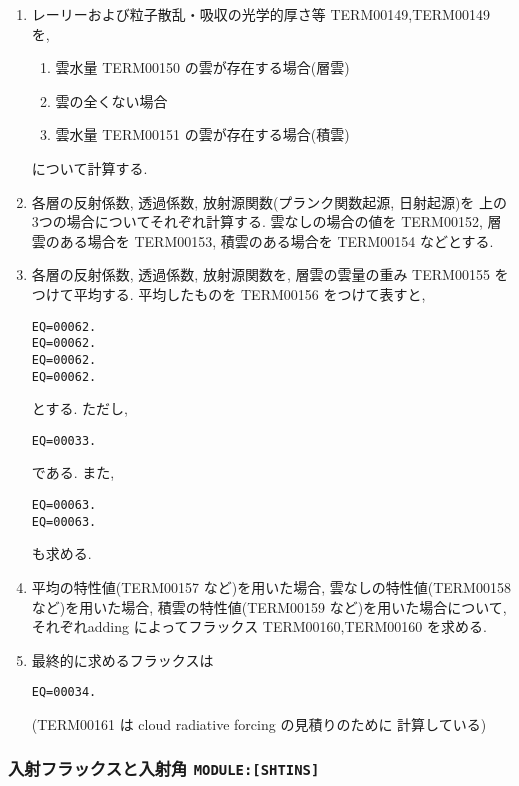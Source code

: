 \begin{enumerate}
\item レーリーおよび粒子散乱・吸収の光学的厚さ等
      TERM00149,TERM00149 を,
      \begin{enumerate}
      \item 雲水量 TERM00150 の雲が存在する場合(層雲)
      \item 雲の全くない場合
      \item 雲水量 TERM00151 の雲が存在する場合(積雲)
      \end{enumerate}
      について計算する.

\item 各層の反射係数, 透過係数, 
      放射源関数(プランク関数起源, 日射起源)を
      上の3つの場合についてそれぞれ計算する.
      雲なしの場合の値を
      TERM00152, 層雲のある場合を TERM00153, 積雲のある場合を
      TERM00154 などとする.

\item 各層の反射係数, 透過係数, 
      放射源関数を, 層雲の雲量の重み TERM00155 をつけて平均する.
      平均したものを TERM00156 をつけて表すと,
      \begin{verbatim}
EQ=00062.
EQ=00062.
EQ=00062.
EQ=00062.
\end{verbatim}
      とする. ただし,
      \begin{verbatim}
EQ=00033.
\end{verbatim}
      である. 
      また,
      \begin{verbatim}
EQ=00063.
EQ=00063.
\end{verbatim}
      も求める.

\item 平均の特性値(TERM00157 など)を用いた場合,
      雲なしの特性値(TERM00158 など)を用いた場合,
      積雲の特性値(TERM00159 など)を用いた場合について,
      それぞれadding によってフラックス
      TERM00160,TERM00160 を求める.
      
\item 最終的に求めるフラックスは
      \begin{verbatim}
EQ=00034.
\end{verbatim}
      (TERM00161 は cloud radiative forcing の見積りのために
       計算している)

\end{enumerate}

\subsubsection{入射フラックスと入射角 \texttt{MODULE:[SHTINS]}}

